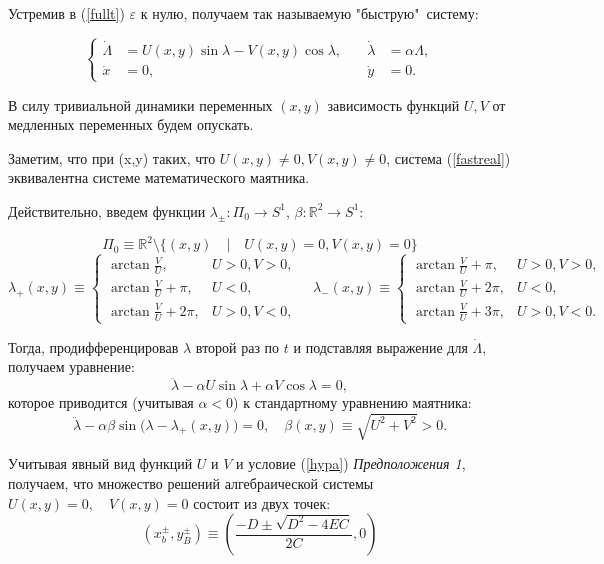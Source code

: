 Устремив в (\ref{fullt}) $\varepsilon$ к нулю, получаем так называемую "быструю"\, систему:

\begin{equation}
    \left\{
    \begin{aligned}
        \dot \Lambda &= U(x,y) \sin \lambda - V(x,y) \cos \lambda,
        &\quad
        \dot \lambda &= \alpha \Lambda, \\[1.5ex]
        \dot x &= 0,
        &\quad
        \dot y &= 0.
    \end{aligned}
    \right.
    \label{fastreal}
\end{equation}

В силу тривиальной динамики переменных $(x, y)$ зависимость функций $U, V$ от медленных переменных будем опускать. 


Заметим, что при (x,y) таких, что $U(x,y) \neq 0, V(x,y) \neq 0$, система (\ref{fastreal}) эквивалентна системе математического маятника. 

Действительно, введем функции 
$\lambda_{\pm}: \Pi_0 \to S^1$, $\beta: \mathbb{R}^2 \to S^1$:

$$\Pi_0 \equiv \mathbb{R}^2 \setminus \{(x,y) \quad | \quad  U(x,y) = 0, V(x,y) = 0\}$$
$$
\lambda_{+}(x,y) \equiv \begin{cases} 
        \arctan \frac{V}{U},        &  U>0, V > 0, \\
        \arctan \frac{V}{U} + \pi,  &  U<0, \\
        \arctan \frac{V}{U} + 2\pi, &  U>0, V<0,
       \end{cases}
\quad
\lambda_{-}(x,y) \equiv \begin{cases} 
        \arctan \frac{V}{U} + \pi,  &  U>0, V > 0, \\
        \arctan \frac{V}{U} + 2\pi, &  U<0, \\
        \arctan \frac{V}{U} + 3\pi, &  U>0, V<0.
       \end{cases}
$$

Тогда, продифференцировав $\lambda$ второй раз по $t$ и подставляя выражение для $\dot \Lambda$, получаем уравнение:
$$\ddot \lambda - \alpha U \sin \lambda + \alpha V \cos \lambda = 0,$$
которое приводится (учитывая $\alpha < 0$) к стандартному уравнению маятника:
$$\ddot \lambda - \alpha \beta \sin \big( \lambda - \lambda_{+}(x,y) \big) = 0, \quad \beta(x,y) \equiv \sqrt{U^2+V^2} > 0.$$

Учитывая явный вид функций $U$ и $V$ и условие (\ref{hypa}) \textit{Предположения 1}, получаем, что множество решений алгебраической системы $U(x,y)=0, \quad V(x,y) = 0$ состоит из двух точек:
$$
(x_b^{\pm}, y_B^\pm) \equiv \left(\frac{-D \pm \sqrt{D^2-4EC}}{2C},0 \right)$$

